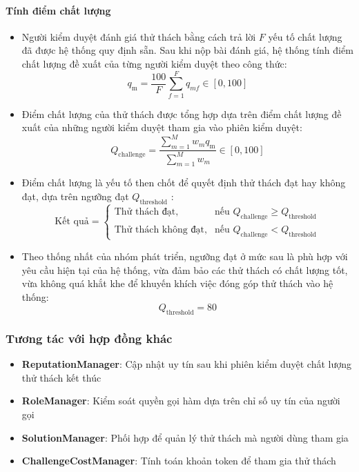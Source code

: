 \paragraph{Tính điểm chất lượng}
\begin{itemize}
  \item Người kiểm duyệt đánh giá thử thách bằng cách trả lời $F$ yếu tố chất lượng đã được hệ thống quy định sẵn. Sau khi nộp bài đánh giá, hệ thống tính điểm chất lượng đề xuất của từng người kiểm duyệt theo công thức: 
    \[q_{\text{m}}=\frac{100}{F} \sum_{f=1}^{F} q_{mf} \in[0,100]\]
  \item Điểm chất lượng của thử thách được tổng hợp dựa trên điểm chất lượng đề xuất của những người kiểm duyệt tham gia vào phiên kiểm duyệt:
    \[Q_{\text{challenge}}=\frac{\sum_{m=1}^{M} w_m q_{\text{m}}}{\sum_{m=1}^{M}w_m} \in[0,100]\]
  \item Điểm chất lượng là yếu tố then chốt để quyết định thử thách đạt hay không đạt, dựa trên ngưỡng đạt $Q_{\text{threshold}}$ :
    \[
    \text{Kết quả} =
    \begin{cases}
    \text{Thử thách đạt}, & \text{nếu } Q_{\text{challenge}} \geq Q_{\text{threshold}} \\
    \text{Thử thách không đạt}, & \text{nếu } Q_{\text{challenge}} < Q_{\text{threshold}}
    \end{cases}
    \]
  \item Theo thống nhất của nhóm phát triển, ngưỡng đạt ở mức sau là phù hợp với yêu cầu hiện tại của hệ thống, vừa đảm bảo các thử thách có chất lượng tốt, vừa không quá khắt khe để khuyến khích việc đóng góp thử thách vào hệ thống:
    \[Q_{\text{threshold}} = 80 \]
  
\end{itemize}


\subsubsection{Tương tác với hợp đồng khác}

\begin{itemize}
  \item \textbf{ReputationManager}: Cập nhật uy tín sau khi phiên kiểm duyệt chất lượng thử thách kết thúc
  \item \textbf{RoleManager}: Kiểm soát quyền gọi hàm dựa trên chỉ số uy tín của người gọi
  \item \textbf{SolutionManager}: Phối hợp để quản lý thử thách mà người dùng tham gia
  \item \textbf{ChallengeCostManager}: Tính toán khoản token để tham gia thử thách
\end{itemize}

